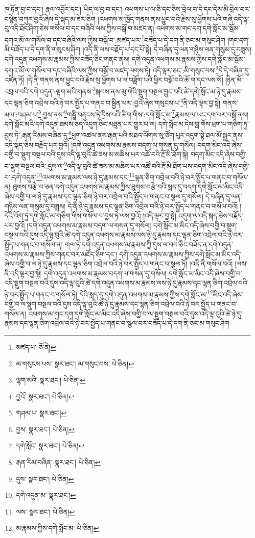 ཁ་ཏོན་བྱ་བ་དང་། རྣལ་འབྱོར་དང་། ཡིད་ལ་བྱ་བ་དང་། འཕགས་པ་ལ་ཅི་དང་ཅིས་བྲེལ་བ་དེ་དང་དེས་མི་བྲེལ་བར་བསྙེན་བཀུར་བྱའོ་ཞེས་དེ་སྐད་མ་ཟེར་ཅིག །འཕགས་མ་ཁྱོད་གནས་ནས་ཕྱུང་བའི་རྗེས་སུ་ཕྱོགས་པའི་གཞི་འདི་ལྟ་བུ་འདི་ཐོང་ཤིག་ཅེས་གསོལ་བ་དང་བཞིའི་ལས་ཀྱིས་བསྒོ་བ་མཛད་ན། འཕགས་མ་གང་དག་དགེ་སློང་མ་སྦོམ་དགའ་མོ་ལ་གསོལ་བ་དང་བཞིའི་ལས་ཀྱིས་བསྒོ་བ་:མཛད་པར་\footnote{མཛད་པ་  ཅོ་ནེ། }བཟོད་པ་དེ་དག་ནི་ཅང་མ་གསུང་ཤིག །གང་དག་མི་བཟོད་པ་དེ་དག་ནི་གསུངས་ཤིག །འདི་ནི་ལས་བརྗོད་པ་དང་པོ་སྟེ། དེ་བཞིན་དུ་ལན་གཉིས་ལན་གསུམ་དུ་བཟླས། དགེ་འདུན་འཕགས་མ་རྣམས་ཀྱིས་བཟོད་ཅིང་གནང་ནས། དགེ་འདུན་འཕགས་མ་རྣམས་ཀྱིས་དགེ་སློང་མ་སྦོམ་དགའ་མོ་ལ་གསོལ་བ་དང་བཞིའི་ལས་ཀྱིས་བསྒོ་བ་མཛད་ལགས་ཏེ། འདི་ལྟར་ཅང་:མི་གསུང་བས་\footnote{མ་གསུངས་པས་  སྣར་ཐང་། མ་གསུང་བས་  པེ་ཅིན། }དེ་དེ་བཞིན་དུ་འཛིན་ཏོ། །དེ་ནི་གནས་ནས་ཕྱུང་བའི་རྗེས་སུ་ཕྱོགས་པ་ལ་བཟློག་པའི་ཕྱིར་བསྒོ་བའི་ཆོ་ག་དང་ལས་སོ། །ཉིན་མོ་འབྲལ་བའི་དགེ་འདུན་:ལྷག་མའི་གནས་\footnote{ལྷག་མའི་  སྣར་ཐང་།  པེ་ཅིན། }སྐབས་ནས་མུ་གེའི་སྡུག་བསྔལ་བྱུང་བའི་ཚེ་དགེ་སློང་མ་ཉེ་དུ་རྣམས་དང་ལྷན་ཅིག་འབྲེལ་བའི་ཉེ་བར་སྤྱོད་པ་གནང་བ་སྦྱིན་པར་:བྱའོ་ཞེས་གསུངས་པ་\footnote{བྱའོ་  སྣར་ཐང་།  པེ་ཅིན། }ནི་འདི་ལྟར་བྱ་སྟེ། གནས་མལ་:བཤམ་པ་\footnote{གཤམ་པ་  སྣར་ཐང་། }:བྱས་ནས་\footnote{བྱས་  སྣར་ཐང་།  པེ་ཅིན། }གཎྜཱི་བརྡུངས་ཏེ་དྲིས་པའི་ཚིག་གིས་:དགེ་སློང་མ་\footnote{དགེ་སློང་  སྣར་ཐང་།  པེ་ཅིན། }རྣམས་ལ་ཡང་དག་པར་བསྒོ་ནས། དགེ་སློང་མའི་དགེ་འདུན་ཐམས་ཅད་འདུག་ཅིང་མཐུན་པར་གྱུར་པ་ལ། དགེ་སློང་མ་དེས་བླ་གོས་ཕྲག་པ་གཅིག་ཏུ་བྱས་ཏེ་:རྒན་རིམས་བཞིན་དུ་\footnote{རྒན་རིམ་བཞིན་  སྣར་ཐང་།  པེ་ཅིན། }ཕྱག་འཚལ་ནས་རྒན་པའི་མཐའ་ལོགས་སུ་ཙོག་པུར་འདུག་སྟེ་ཐལ་མོ་སྦྱར་ནས་འདི་སྐད་ཅེས་བརྗོད་པར་བྱའོ། །དགེ་འདུན་འཕགས་མ་རྣམས་བདག་ལ་གསན་དུ་གསོལ། བདག་མིང་འདི་ཞེས་བགྱི་བ་སྡུག་བསྔལ་བའི་དུས་འདི་ལྟ་བུའི་ཚེ་ཟས་མ་མཆིས་པར་འཚོ་བའི་རྔོ་མི་ཐོག་སྟེ། བདག་མིང་འདི་ཞེས་བགྱི་བ་སྡུག་བསྔལ་བའི་:དུས་ལ་\footnote{དུས་  སྣར་ཐང་།  པེ་ཅིན། }འདི་ལྟ་བུའི་ཚེ་ཟས་མ་མཆིས་པར་འཚོ་བའི་རྔོ་མི་ཐོག་པས་བདག་མིང་འདི་ཞེས་བགྱི་བ་:དགེ་འདུན་\footnote{དགེ་འདུན་མ་  སྣར་ཐང་། }འཕགས་མ་རྣམས་ལས་ཉེ་དུ་རྣམས་དང་\footnote{ལས་  སྣར་ཐང་།  པེ་ཅིན། }ལྷན་ཅིག་འབྲེལ་བའི་ཉེ་བར་སྤྱོད་པ་གནང་བ་གསོལ་ན། ཐུགས་བརྩེ་བ་ཅན་དགེ་འདུན་འཕགས་མ་རྣམས་ཀྱིས་ཐུགས་བརྩེ་བའི་སླད་དུ་བདག་དགེ་སློང་མ་མིང་འདི་ཞེས་བགྱི་བ་ལ་ཉེ་དུ་རྣམས་དང་ལྷན་ཅིག་ཉེ་བར་འབྲེལ་བའི་སྤྱོད་པ་གནང་བ་སྩལ་དུ་གསོལ། དེ་བཞིན་དུ་ལན་གཉིས་ལན་གསུམ་དུ་བཟླས། དེ་ནི་ཉེ་དུ་རྣམས་དང་ལྷན་ཅིག་འབྲེལ་བའི་ཉེ་བར་སྤྱོད་པ་གནང་བ་གསོལ་བའོ། །དེའི་འོག་ཏུ་དགེ་སློང་མ་གཅིག་གིས་གསོལ་བ་བྱས་ཏེ་ལས་བྱའོ། །འདི་ལྟར་བྱ་སྟེ། འདུག་ལ་འདི་སྐད་ཅེས་བརྗོད་པར་བྱའོ། །དགེ་འདུན་འཕགས་མ་རྣམས་བདག་ལ་གསན་དུ་གསོལ། དགེ་སློང་མ་མིང་འདི་ཞེས་བགྱི་བ་སྡུག་བསྔལ་བའི་དུས་འདི་ལྟ་བུའི་ཚེ་དགེ་འདུན་འཕགས་མ་རྣམས་ལས་ཉེ་དུ་རྣམས་དང་ལྷན་ཅིག་འབྲེལ་བའི་ཉེ་བར་སྤྱོད་པ་གནང་བ་གསོལ་ན། གལ་ཏེ་དགེ་འདུན་འཕགས་མ་རྣམས་ཀྱི་དུས་ལ་བབ་ཅིང་བཟོད་ན་དགེ་འདུན་འཕགས་མ་རྣམས་ཀྱིས་གནང་བར་མཛོད་ཅིག་དང་། དགེ་འདུན་འཕགས་མ་རྣམས་ཀྱིས་དགེ་སློང་མ་མིང་འདི་ཞེས་བགྱི་བ་ལ་ཉེ་དུ་རྣམས་དང་ལྷན་ཅིག་འབྲེལ་བའི་ཉེ་བར་སྤྱོད་པ་གནང་བ་སྩལ་ཏོ། །འདི་ནི་གསོལ་བའོ། །ལས་ནི་འདི་ལྟར་བྱ་སྟེ། དགེ་འདུན་འཕགས་མ་རྣམས་བདག་ལ་གསན་དུ་གསོལ། དགེ་སློང་མ་མིང་འདི་ཞེས་བགྱི་བ་འདི་སྡུག་བསྔལ་བའི་དུས་འདི་ལྟ་བུའི་ཚེ་དགེ་འདུན་འཕགས་མ་རྣམས་ལས་ཉེ་དུ་རྣམས་དང་ལྷན་ཅིག་འབྲེལ་བའི་ཉེ་བར་སྤྱོད་པ་གནང་བ་གསོལ་ཏེ། དེའི་སླད་དུ་དགེ་འདུན་འཕགས་མ་རྣམས་ཀྱིས་དགེ་སློང་མ་\footnote{མ་རྣམས་ཀྱིས་དགེ་སློང་མ་  པེ་ཅིན། }མིང་འདི་ཞེས་བགྱི་བ་ལ་སྡུག་བསྔལ་བའི་དུས་འདི་ལྟ་བུའི་ཚེ་ཉེ་དུ་རྣམས་དང་ལྷན་ཅིག་འབྲེལ་བའི་ཉེ་བར་སྤྱོད་པ་གནང་བ་གསོལ་ན། འཕགས་མ་གང་དག་དགེ་སློང་མ་མིང་འདི་ཞེས་བགྱི་བ་ལ་སྡུག་བསྔལ་བའི་དུས་འདི་ལྟ་བུའི་ཚེ་ཉེ་དུ་རྣམས་དང་ལྷན་ཅིག་འབྲེལ་བའི་ཉེ་བར་སྤྱོད་པ་གནང་བ་སྩལ་བར་བཟོད་པ་དེ་དག་ནི་ཅང་མ་གསུང་ཤིག 